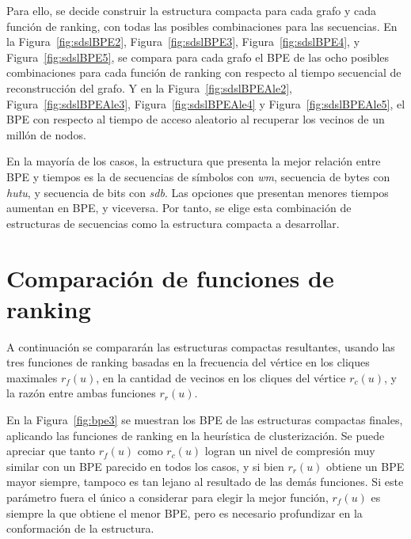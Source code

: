 Para ello, se decide construir la estructura compacta para cada grafo y cada función de ranking, con todas las posibles combinaciones para las secuencias. En la Figura~\ref{fig:sdslBPE2}, Figura~\ref{fig:sdslBPE3}, Figura~\ref{fig:sdslBPE4}, y Figura~\ref{fig:sdslBPE5}, se compara para cada grafo el BPE de las ocho posibles combinaciones para cada función de ranking con respecto al tiempo secuencial de reconstrucción del grafo. Y en la Figura~\ref{fig:sdslBPEAle2}, Figura~\ref{fig:sdslBPEAle3}, Figura~\ref{fig:sdslBPEAle4} y Figura~\ref{fig:sdslBPEAle5}, el BPE con respecto al tiempo de acceso aleatorio al recuperar los vecinos de un millón de nodos.

En la mayoría de los casos, la estructura que presenta la mejor relación entre BPE y tiempos es la de secuencias de símbolos con \textit{wm}, secuencia de bytes con \textit{hutu}, y secuencia de bits con \textit{sdb}.  Las opciones que presentan menores tiempos aumentan en BPE, y viceversa. Por tanto, se elige esta combinación de estructuras de secuencias como la estructura compacta a desarrollar.











\section{Comparación de funciones de ranking}

A continuación se compararán las estructuras compactas resultantes, usando las tres funciones de ranking basadas en la frecuencia del vértice en los cliques maximales $r_{f}(u)$, en la cantidad de vecinos en los cliques del vértice $r_{c}(u)$, y la razón entre ambas funciones $r_{r}(u)$. 

En la Figura~\ref{fig:bpe3} se muestran los BPE de las estructuras compactas finales, aplicando las funciones de ranking en la heurística de clusterización. Se puede apreciar que tanto $r_{f}(u)$ como $r_{c}(u)$ logran un nivel de compresión muy similar con un BPE parecido en todos los casos, y si bien $r_{r}(u)$ obtiene un BPE mayor siempre, tampoco es tan lejano al resultado de las demás funciones. Si este parámetro fuera el único a considerar para elegir la mejor función, $r_{f}(u)$ es siempre la que obtiene el menor BPE, pero es necesario profundizar en la conformación de la estructura.

%


